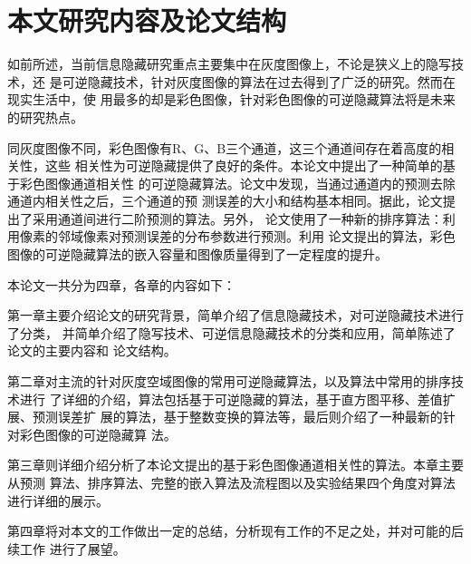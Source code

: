 \section{本文研究内容及论文结构}
\label{s:contribution_of_this_thesis}
如前所述，当前信息隐藏研究重点主要集中在灰度图像上，不论是狭义上的隐写技术，还
是可逆隐藏技术，针对灰度图像的算法在过去得到了广泛的研究。然而在现实生活中，使
用最多的却是彩色图像，针对彩色图像的可逆隐藏算法将是未来的研究热点。
\par
同灰度图像不同，彩色图像有R、G、B三个通道，这三个通道间存在着高度的相关性，这些
相关性为可逆隐藏提供了良好的条件。本论文中提出了一种简单的基于彩色图像通道相关性
的可逆隐藏算法。论文中发现，当通过通道内的预测去除通道内相关性之后，三个通道的预
测误差的大小和结构基本相同。据此，论文提出了采用通道间进行二阶预测的算法。另外，
论文使用了一种新的排序算法：利用像素的邻域像素对预测误差的分布参数进行预测。利用
论文提出的算法，彩色图像的可逆隐藏算法的嵌入容量和图像质量得到了一定程度的提升。
\par
本论文一共分为四章，各章的内容如下：
\par
第一章主要介绍论文的研究背景，简单介绍了信息隐藏技术，对可逆隐藏技术进行了分类，
并简单介绍了隐写技术、可逆信息隐藏技术的分类和应用，简单陈述了论文的主要内容和
论文结构。
\par
第二章对主流的针对灰度空域图像的常用可逆隐藏算法，以及算法中常用的排序技术进行
了详细的介绍，算法包括基于可逆隐藏的算法，基于直方图平移、差值扩展、预测误差扩
展的算法，基于整数变换的算法等，最后则介绍了一种最新的针对彩色图像的可逆隐藏算
法。
\par
第三章则详细介绍分析了本论文提出的基于彩色图像通道相关性的算法。本章主要从预测
算法、排序算法、完整的嵌入算法及流程图以及实验结果四个角度对算法进行详细的展示。
\par
第四章将对本文的工作做出一定的总结，分析现有工作的不足之处，并对可能的后续工作
进行了展望。\\
